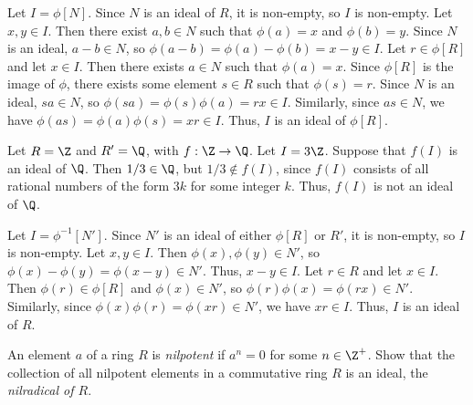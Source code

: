 \begin{solution}[(i)]
  Let $I = \phi[N]$. Since $N$ is an ideal of $R$, it is non-empty, so $I$ is non-empty. Let $x, y \in I$. Then there exist $a, b \in N$ such that $\phi(a) = x$ and $\phi(b) = y$. Since $N$ is an ideal, $a - b \in N$, so $\phi(a - b) = \phi(a) - \phi(b) = x - y \in I$. Let $r \in \phi[R]$ and let $x \in I$. Then there exists $a \in N$ such that $\phi(a) = x$. Since $\phi[R]$ is the image of $\phi$, there exists some element $s \in R$ such that $\phi(s) = r$. Since $N$ is an ideal, $sa \in N$, so $\phi(sa) = \phi(s)\phi(a) = rx \in I$. Similarly, since $as \in N$, we have $\phi(as) = \phi(a)\phi(s) = xr \in I$. Thus, $I$ is an ideal of $\phi[R]$.
\end{solution}

\begin{solution}[(ii)]
  Let $R = \Z$ and $R' = \Q$, with $f : \Z \to \Q$. Let $I = 3\Z$. Suppose that $f(I)$ is an ideal of $\Q$. Then $1/3 \in \Q$, but $1/3 \notin f(I)$, since $f(I)$ consists of all rational numbers of the form $3k$ for some integer $k$. Thus, $f(I)$ is not an ideal of $\Q$.
\end{solution}

\begin{solution}[(iii)]
  Let $I = \phi^{-1}[N']$. Since $N'$ is an ideal of either $\phi[R]$ or $R'$, it is non-empty, so $I$ is non-empty. Let $x, y \in I$. Then $\phi(x), \phi(y) \in N'$, so $\phi(x) - \phi(y) = \phi(x - y) \in N'$. Thus, $x - y \in I$. Let $r \in R$ and let $x \in I$. Then $\phi(r) \in \phi[R]$ and $\phi(x) \in N'$, so $\phi(r)\phi(x) = \phi(rx) \in N'$. Similarly, since $\phi(x)\phi(r) = \phi(xr) \in N'$, we have $xr \in I$. Thus, $I$ is an ideal of $R$.
\end{solution}

\begin{problem}[30.30]
  An element $a$ of a ring $R$ is \textit{nilpotent} if $a^n = 0$ for some $n \in \Z^+$. Show that the collection of all nilpotent elements in a commutative ring $R$ is an ideal, the \textit{nilradical of $R$}.
\end{problem}

